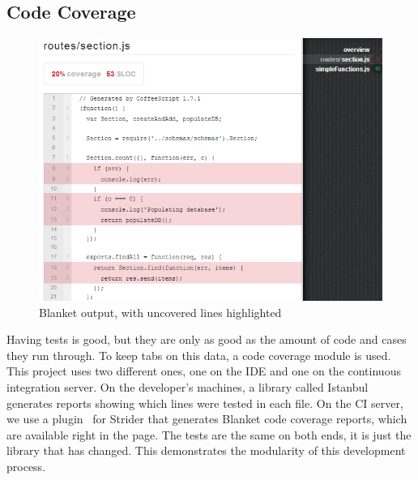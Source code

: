 \documentclass[12pt]{article}
\begin{document}
\subsection{Code Coverage}\label{sec:coverage}
\begin{figure}[h!]
\includegraphics[width=\linewidth]{img/strider_3.png}
\caption{Blanket output, with uncovered lines highlighted}
\end{figure}
Having tests is good, but they are only as good as the amount of code and cases they run through. 
To keep tabs on this data, a code coverage module is used. 
This project uses two different ones, one on the IDE and one on the continuous integration server. 
On the developer's machines, a library called Istanbul~\cite{Istanbul} generates reports showing which lines were tested in each file. 
On the CI server, we use a plugin~\cite{Blanket} for Strider that generates Blanket code coverage reports, which are available right in the page. 
The tests are the same on both ends, it is just the library that has changed. 
This demonstrates the modularity of this development process.
\end{document}
